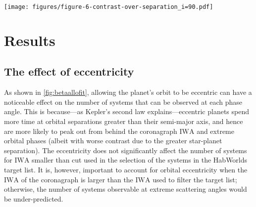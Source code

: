\documentclass[usenatbib]{mnras}
\newcommand{\IWA}{\ensuremath{\mathrm{IWA}}\xspace}
\newcommand{\HWO}{HabWorlds\xspace}
\begin{document}
\begin{figure*}
    \centering
    \texttt{[image: figures/figure-6-contrast-over-separation\_i=90.pdf]}
    \caption{
        The contrast (\cref{eq:contrast}) and orbital separation of an Earth-like planet with an ocean surface and patchy clouds along its orbit with an assumed inclination angle $i$ of \qty{90}{\degree} around $\alpha$~Cen~A, $\epsilon$~Eri, and Lalande~21185.
        The solid, black line indicates the contrast in unpolarized light, with the contrast at quadrature marked by the black dot.
        The polarized component is indicated by the coloured dots, with the colour representing the phase angle from quadrature.
        The light grey dots show the contrasts at quadrature of the other targets in the star list, and the dashed lines indicate $1$, $2$ and $3$ times the \IWA for \HWO.
    }
    \label{fig:contrasts}
\end{figure*}





\section{Results}
\label{sec:3}

\subsection{The effect of eccentricity}
\label{sec:result_eccentricity}

As shown in \cref{fig:betaallofit}, allowing the planet's orbit to be eccentric can have a noticeable effect on the number of systems that can be observed at each phase angle.
This is because---as Kepler's second law explains---eccentric planets spend more time at orbital separations greater than their semi-major axis, and hence are more likely to peak out from behind the coronagraph \IWA and extreme orbital phases (albeit with worse contrast due to the greater star-planet separation).
The eccentricity does not significantly affect the number of systems for \IWA smaller than cut used in the selection of the systems in the \HWO target list. 
It is, however, important to account for orbital eccentricity when the \IWA of the coronagraph is larger than the \IWA used to filter the target list; otherwise, the number of systems observable at extreme scattering angles would be under-predicted.
\end{document}
